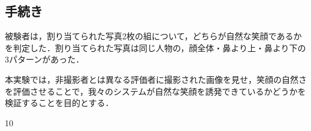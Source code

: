 \documentclass[submit,techreq]{ec2014}
\def\|{\verb|}
\begin{document}
\subsection{手続き}

被験者は，割り当てられた写真2枚の組について，どちらが自然な笑顔であるかを判定した．割り当てられた写真は同じ人物の，顔全体・鼻より上・鼻より下の3パターンがあった．

本実験では，非撮影者とは異なる評価者に撮影された画像を見せ，笑顔の自然さを評価させることで，我々のシステムが自然な笑顔を誘発できているかどうかを検証することを目的とする．



\begin{thebibliography}{10}

\end{thebibliography}



%\pagebreak%%!!!
%\vspace*{-\baselineskip}%%!!!

%\appendix
%7
%\section{付録の書き方}

%付録がある場合には，参考文献リストの直後にコマンド \|\appendix| に引き続





\end{document}

